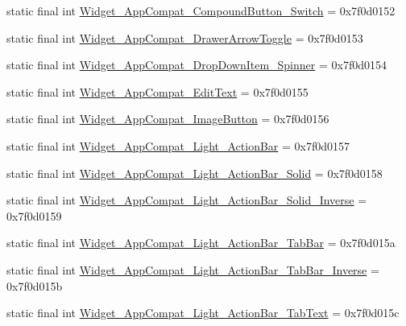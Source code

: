 \begin{DoxyCompactItemize}
\item 
static final int \mbox{\hyperlink{classcom_1_1google_1_1android_1_1gms_1_1R_1_1style_ab8cc85d54933a218f03e3076b8de0d4e}{Widget\+\_\+\+App\+Compat\+\_\+\+Compound\+Button\+\_\+\+Switch}} = 0x7f0d0152
\item 
static final int \mbox{\hyperlink{classcom_1_1google_1_1android_1_1gms_1_1R_1_1style_a5b95bf5c76151e2b01f9df3fe0559c70}{Widget\+\_\+\+App\+Compat\+\_\+\+Drawer\+Arrow\+Toggle}} = 0x7f0d0153
\item 
static final int \mbox{\hyperlink{classcom_1_1google_1_1android_1_1gms_1_1R_1_1style_a07a8c585f3089d5d83bc7e134fa60e00}{Widget\+\_\+\+App\+Compat\+\_\+\+Drop\+Down\+Item\+\_\+\+Spinner}} = 0x7f0d0154
\item 
static final int \mbox{\hyperlink{classcom_1_1google_1_1android_1_1gms_1_1R_1_1style_a3178e5b247049df21b909c9cbf07dd08}{Widget\+\_\+\+App\+Compat\+\_\+\+Edit\+Text}} = 0x7f0d0155
\item 
static final int \mbox{\hyperlink{classcom_1_1google_1_1android_1_1gms_1_1R_1_1style_a1b7a518b199296ad33c481140de4d097}{Widget\+\_\+\+App\+Compat\+\_\+\+Image\+Button}} = 0x7f0d0156
\item 
static final int \mbox{\hyperlink{classcom_1_1google_1_1android_1_1gms_1_1R_1_1style_ac76b94db9d59c4222f57dbca6c11de94}{Widget\+\_\+\+App\+Compat\+\_\+\+Light\+\_\+\+Action\+Bar}} = 0x7f0d0157
\item 
static final int \mbox{\hyperlink{classcom_1_1google_1_1android_1_1gms_1_1R_1_1style_af1e9d29c49360692cf89cddf04ff2067}{Widget\+\_\+\+App\+Compat\+\_\+\+Light\+\_\+\+Action\+Bar\+\_\+\+Solid}} = 0x7f0d0158
\item 
static final int \mbox{\hyperlink{classcom_1_1google_1_1android_1_1gms_1_1R_1_1style_a7eb095d12d2b7a26c757458f51c4fa99}{Widget\+\_\+\+App\+Compat\+\_\+\+Light\+\_\+\+Action\+Bar\+\_\+\+Solid\+\_\+\+Inverse}} = 0x7f0d0159
\item 
static final int \mbox{\hyperlink{classcom_1_1google_1_1android_1_1gms_1_1R_1_1style_ab05a5576e211e54318c3a4fb9a41a93a}{Widget\+\_\+\+App\+Compat\+\_\+\+Light\+\_\+\+Action\+Bar\+\_\+\+Tab\+Bar}} = 0x7f0d015a
\item 
static final int \mbox{\hyperlink{classcom_1_1google_1_1android_1_1gms_1_1R_1_1style_ada6335bf3f92ce1109f8504db82909ea}{Widget\+\_\+\+App\+Compat\+\_\+\+Light\+\_\+\+Action\+Bar\+\_\+\+Tab\+Bar\+\_\+\+Inverse}} = 0x7f0d015b
\item 
static final int \mbox{\hyperlink{classcom_1_1google_1_1android_1_1gms_1_1R_1_1style_a242222a086941075bee510b08482fa77}{Widget\+\_\+\+App\+Compat\+\_\+\+Light\+\_\+\+Action\+Bar\+\_\+\+Tab\+Text}} = 0x7f0d015c

\end{DoxyCompactItemize}

